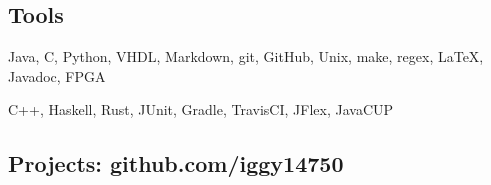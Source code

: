 \documentclass[18pt]{article}
\providecommand{\tightlist}{
    \setlength{\itemsep}{0pt}\setlength{\parskip}{0pt}
}
\begin{document}
  \subsection*{Tools}\label{languages}
  \begin{description}\tightlist
      \item[Proficient:] Java,
      C,
      Python,
      VHDL,
      Markdown,
      git,
      GitHub,
      Unix,
      make,
      regex,
      \LaTeX,
      Javadoc,
      FPGA
      \item[Learning:] C++, 
      Haskell, 
      Rust,
      JUnit, 
      Gradle,
      TravisCI,
      JFlex,
      JavaCUP
  \end{description}


    \subsection*{Projects: github.com/iggy14750}\label{projects}
\end{document}
